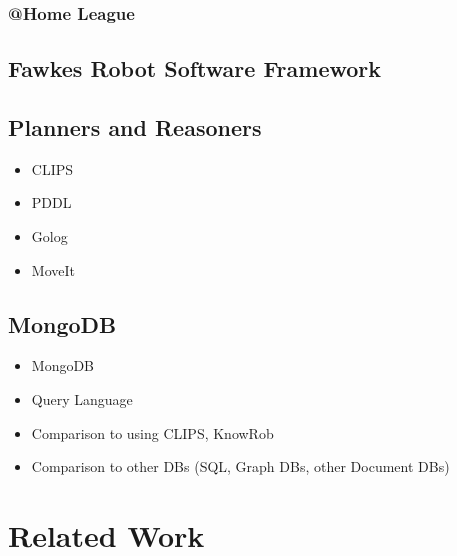 \documentclass[a4paper,11pt]{article}
\begin{document}
\subsubsection{@Home League}


\subsection{Fawkes Robot Software Framework}
\label{sec:fawkes}


\subsection{Planners and Reasoners}
\label{sec:planners}
\begin{itemize}
\item CLIPS
\item PDDL
\item Golog
\item MoveIt
\end{itemize}
\subsection{MongoDB}
\label{sec:mongodb}
\begin{itemize}
\item MongoDB
\item Query Language
\item Comparison to using CLIPS, KnowRob
\item Comparison to other DBs (SQL, Graph DBs, other Document DBs)
\end{itemize}

\section{Related Work}
\label{sec:related}
\end{document}
